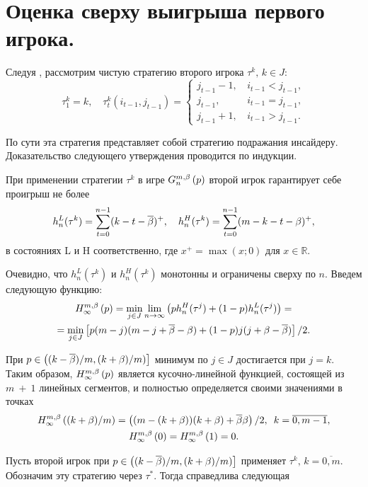 \section{Оценка сверху выигрыша первого игрока.}
Следуя \cite{domansky07}, рассмотрим чистую стратегию второго игрока $\tau^k, \,
k \in J$:
\[
  \tau^k_1 = k, \quad \tau^k_t(i_{t-1}, j_{t-1}) = \begin{cases}
    j_{t-1} - 1, & \, i_{t-1} < j_{t-1}, \\
    j_{t-1},     & \, i_{t-1} = j_{t-1}, \\
    j_{t-1} + 1, & \, i_{t-1} > j_{t-1}.
  \end{cases}
\]

По сути эта стратегия представляет собой стратегию подражания инсайдеру.
Доказательство следующего утверждения проводится по индукции.

\begin{proposition}
  \label{proposition:secondPlayerStrategyPayoffs}
  При применении стратегии $\tau^k$ в игре $G_{n}^{m, \beta}\left({p}\right)$ второй игрок
  гарантирует себе проигрыш не более
  \[
    h_n^L(\tau^k) = \sum_{t=0}^{n-1}(k - t - \overline{\beta})^+, \quad h_n^H(\tau^k) =
    \sum_{t=0}^{n-1}(m - k - t - \beta)^+,
  \]
  в состояниях L и H соответственно, где $x^+ = \max(x; 0)$ для $x \in
  \mathbb{R}$.
\end{proposition}

Очевидно, что $h_n^L(\tau^k)$ и $h_n^H(\tau^k)$ монотонны и ограничены сверху по
$n$. Введем следующую функцию:
\begin{multline*}
  H_{\infty}^{m,\beta}\left({p}\right) = \min_{j \in J} \lim_{n \rightarrow \infty}\left(
    ph_n^H(\tau^j) + (1-p)h_n^L(\tau^j)
  \right) = \\
  = \min_{j \in J} \left[ p (m - j)(m - j + \overline{\beta} - \beta) + (1 - p)j(j + \beta
    - \overline{\beta}) \right] / 2.
\end{multline*}

При $p \in \left( (k-\overline{\beta})/m, (k+\beta)/m) \right]$ минимум по $j \in J$
достигается при $j = k$. Таким образом, $H_{\infty}^{m,\beta}\left({p}\right)$ является
кусочно-линейной функцией, состоящей из $m~+~1$ линейных сегментов, и полностью
определяется своими значениями в точках
\begin{gather*}
  H_{\infty}^{m,\beta}\left({(k+\beta)/m}\right) = \left( (m - (k + \beta))(k + \beta) + \overline{\beta}\beta
  \right) / 2, \enskip
  k = \overline{0, m - 1},\\
  H_{\infty}^{m,\beta}\left({0}\right) = H_{\infty}^{m,\beta}\left({1}\right) = 0.
\end{gather*}

Пусть второй игрок при $p \in \left( (k-\overline{\beta})/m, (k+\beta)/m) \right]$
применяет $\tau^k, \, k = \overline{0, m}$. Обозначим эту стратегию через
$\tau^*$. Тогда справедлива следующая


